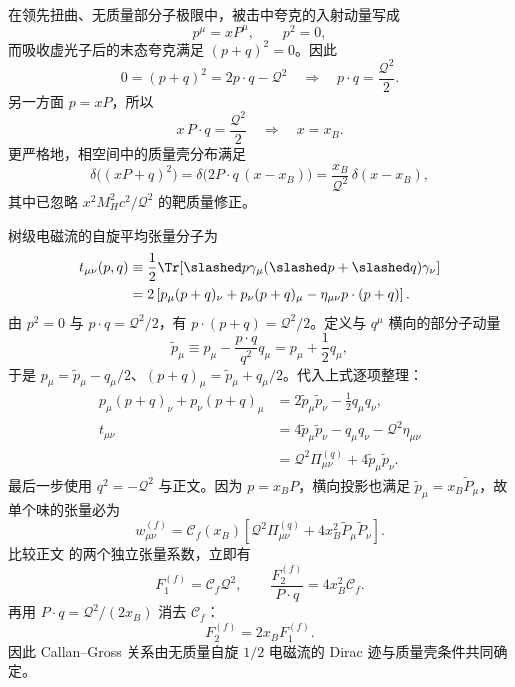 \begin{derivation}[深度非弹性散射的树级结构函数]
在领先扭曲、无质量部分子极限中，被击中夸克的入射动量写成
\begin{equation*}
 p^\mu=xP^\mu,
 \qquad p^2=0,
\end{equation*}
而吸收虚光子后的末态夸克满足 $(p+q)^2=0$。因此
\begin{equation*}
 0=(p+q)^2=2p\cdot q-\mathcal Q^2
 \quad\Longrightarrow\quad
 p\cdot q=\frac{\mathcal Q^2}{2}.
\end{equation*}
另一方面 $p=xP$，所以
\begin{equation*}
 x\,P\cdot q=\frac{\mathcal Q^2}{2}
 \quad\Longrightarrow\quad x=x_B.
\end{equation*}
更严格地，相空间中的质量壳分布满足
\begin{equation*}
 \delta\!\bigl((xP+q)^2\bigr)
 =\delta\!\bigl(2P\cdot q\,(x-x_B)\bigr)
 =\frac{x_B}{\mathcal Q^2}\,\delta(x-x_B),
\end{equation*}
其中已忽略 $x^2M_H^2c^2/\mathcal Q^2$ 的靶质量修正。

树级电磁流的自旋平均张量分子为
\begin{align*}
 t_{\mu\nu}(p,q)
 &\equiv \frac12\Tr\!\left[\slashed p\gamma_\mu(\slashed p+\slashed q)\gamma_\nu\right]\\
 &=2\left[p_\mu(p+q)_\nu+p_\nu(p+q)_\mu
 -\eta_{\mu\nu}p\cdot(p+q)\right].
\end{align*}
由 $p^2=0$ 与 $p\cdot q=\mathcal Q^2/2$，有 $p\cdot(p+q)=\mathcal Q^2/2$。定义与 $q^\mu$ 横向的部分子动量
\begin{equation*}
 \widetilde p_\mu
 \equiv p_\mu-\frac{p\cdot q}{q^2}q_\mu
 =p_\mu+\frac12q_\mu,
\end{equation*}
于是 $p_\mu=\widetilde p_\mu-q_\mu/2$、$(p+q)_\mu=\widetilde p_\mu+q_\mu/2$。代入上式逐项整理：
\begin{align*}
 p_\mu(p+q)_\nu+p_\nu(p+q)_\mu
 &=2\widetilde p_\mu\widetilde p_\nu-\frac12q_\mu q_\nu,\\
 t_{\mu\nu}
 &=4\widetilde p_\mu\widetilde p_\nu-q_\mu q_\nu-\mathcal Q^2\eta_{\mu\nu}\\
 &=\mathcal Q^2\Pi_{\mu\nu}^{(q)}+4\widetilde p_\mu\widetilde p_\nu.
\end{align*}
最后一步使用 $q^2=-\mathcal Q^2$ 与正文。因为 $p=x_BP$，横向投影也满足 $\widetilde p_\mu=x_B\widetilde P_\mu$，故单个味的张量必为
\begin{equation*}
 w_{\mu\nu}^{(f)}
 =\mathcal C_f(x_B)
 \left[
 \mathcal Q^2\Pi_{\mu\nu}^{(q)}
 +4x_B^2\widetilde P_\mu\widetilde P_\nu
 \right].
\end{equation*}
比较正文 的两个独立张量系数，立即有
\begin{equation*}
 F_1^{(f)}=\mathcal C_f\mathcal Q^2,
 \qquad
 \frac{F_2^{(f)}}{P\cdot q}=4x_B^2\mathcal C_f.
\end{equation*}
再用 $P\cdot q=\mathcal Q^2/(2x_B)$ 消去 $\mathcal C_f$：
\begin{equation*}
 \boxed{F_2^{(f)}=2x_BF_1^{(f)}}.
\end{equation*}
因此 Callan--Gross 关系由无质量自旋 $1/2$ 电磁流的 Dirac 迹与质量壳条件共同确定。


\end{derivation}
